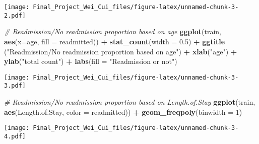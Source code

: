 \documentclass[
]{article}
\newenvironment{Shaded}{\begin{snugshade}}{\end{snugshade}}
\newcommand{\CommentTok}[1]{\textcolor[rgb]{0.56,0.35,0.01}{\textit{#1}}}
\newcommand{\DataTypeTok}[1]{\textcolor[rgb]{0.13,0.29,0.53}{#1}}
\newcommand{\DecValTok}[1]{\textcolor[rgb]{0.00,0.00,0.81}{#1}}
\newcommand{\FloatTok}[1]{\textcolor[rgb]{0.00,0.00,0.81}{#1}}
\newcommand{\KeywordTok}[1]{\textcolor[rgb]{0.13,0.29,0.53}{\textbf{#1}}}
\newcommand{\NormalTok}[1]{#1}
\newcommand{\OperatorTok}[1]{\textcolor[rgb]{0.81,0.36,0.00}{\textbf{#1}}}
\newcommand{\StringTok}[1]{\textcolor[rgb]{0.31,0.60,0.02}{#1}}
\begin{document}
\texttt{[image: Final\_Project\_Wei\_Cui\_files/figure-latex/unnamed-chunk-3-2.pdf]}

\begin{Shaded}
\begin{Highlighting}[]
\CommentTok{# Readmission/No readmission proportion based on age}
\KeywordTok{ggplot}\NormalTok{(train, }\KeywordTok{aes}\NormalTok{(}\DataTypeTok{x=}\NormalTok{age, }\DataTypeTok{fill =}\NormalTok{ readmitted)) }\OperatorTok{+}
\StringTok{  }\KeywordTok{stat_count}\NormalTok{(}\DataTypeTok{width =} \FloatTok{0.5}\NormalTok{) }\OperatorTok{+}
\StringTok{  }\KeywordTok{ggtitle}\NormalTok{ (}\StringTok{"Readmission/No readmission proportion based on age"}\NormalTok{) }\OperatorTok{+}
\StringTok{  }\KeywordTok{xlab}\NormalTok{(}\StringTok{"age"}\NormalTok{) }\OperatorTok{+}
\StringTok{  }\KeywordTok{ylab}\NormalTok{(}\StringTok{"total count"}\NormalTok{) }\OperatorTok{+}
\StringTok{  }\KeywordTok{labs}\NormalTok{(}\DataTypeTok{fill =} \StringTok{"Readmission or not"}\NormalTok{)}
\end{Highlighting}
\end{Shaded}

\texttt{[image: Final\_Project\_Wei\_Cui\_files/figure-latex/unnamed-chunk-3-3.pdf]}

\begin{Shaded}
\begin{Highlighting}[]
\CommentTok{# Readmission/No readmission proportion based on Length.of.Stay}
\KeywordTok{ggplot}\NormalTok{(train, }\KeywordTok{aes}\NormalTok{(Length.of.Stay, }\DataTypeTok{color =}\NormalTok{ readmitted)) }\OperatorTok{+}
\StringTok{  }\KeywordTok{geom_freqpoly}\NormalTok{(}\DataTypeTok{binwidth =} \DecValTok{1}\NormalTok{)}
\end{Highlighting}
\end{Shaded}

\texttt{[image: Final\_Project\_Wei\_Cui\_files/figure-latex/unnamed-chunk-3-4.pdf]}

\begin{Shaded}
\end{Shaded}
\end{document}
